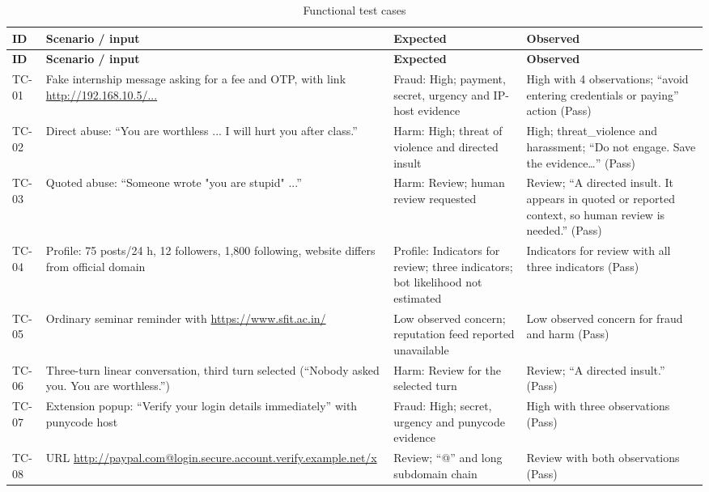 \begin{footnotesize}
\renewcommand{\arraystretch}{1.15}
\setcounter{LTchunksize}{4}\begin{longtable}{|l|>{\raggedright\arraybackslash}p{4.6cm}|>{\raggedright\arraybackslash}p{4.3cm}|>{\raggedright\arraybackslash}p{4.4cm}|}
\caption{Functional test cases}\label{tab:tests}\\
\hline
\textbf{ID} & \textbf{Scenario / input} & \textbf{Expected} & \textbf{Observed} \\ \hline
\endfirsthead
\hline
\textbf{ID} & \textbf{Scenario / input} & \textbf{Expected} & \textbf{Observed} \\ \hline
\endhead
TC-01 & Fake internship message asking for a fee and OTP, with link \url{http://192.168.10.5/...} & Fraud: High; payment, secret, urgency and IP-host evidence & High with 4 observations; ``avoid entering credentials or paying'' action (Pass) \\ \hline
TC-02 & Direct abuse: ``You are worthless ... I will hurt you after class.'' & Harm: High; threat of violence and directed insult & High; threat\_violence and harassment; ``Do not engage. Save the evidence\dots'' (Pass) \\ \hline
TC-03 & Quoted abuse: ``Someone wrote "you are stupid" ...'' & Harm: Review; human review requested & Review; ``A directed insult. It appears in quoted or reported context, so human review is needed.'' (Pass) \\ \hline
TC-04 & Profile: 75 posts/24 h, 12 followers, 1,800 following, website differs from official domain & Profile: Indicators for review; three indicators; bot likelihood not estimated & Indicators for review with all three indicators (Pass) \\ \hline
TC-05 & Ordinary seminar reminder with \url{https://www.sfit.ac.in/} & Low observed concern; reputation feed reported unavailable & Low observed concern for fraud and harm (Pass) \\ \hline
TC-06 & Three-turn linear conversation, third turn selected (``Nobody asked you. You are worthless.'') & Harm: Review for the selected turn & Review; ``A directed insult.'' (Pass) \\ \hline
TC-07 & Extension popup: ``Verify your login details immediately'' with punycode host & Fraud: High; secret, urgency and punycode evidence & High with three observations (Pass) \\ \hline
TC-08 & URL \url{http://paypal.com@login.secure.account.verify.example.net/x} & Review; ``@'' and long subdomain chain & Review with both observations (Pass) \\ \hline

\end{longtable}
\end{footnotesize}

